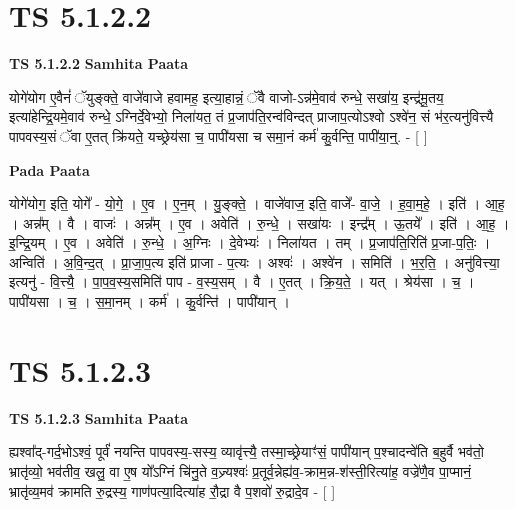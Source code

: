 \documentclass[17pt]{extarticle}
\begin{document}
\section*{ TS 5.1.2.2 }

\textbf{TS 5.1.2.2 } \newline
\textbf{Samhita Paata} \newline

योगे॑योग ए॒वैनं॑ ॅयुङ्क्ते॒ वाजे॑वाजे हवामह॒ इत्या॒हान्नं॒ ॅवै वाजो-ऽन्न॑मे॒वाव॑ रुन्धे॒ सखा॑य॒ इन्द्र॑मू॒तय॒ इत्या॑हेन्द्रि॒यमे॒वाव॑ रुन्धे॒ ऽग्निर्दे॒वेभ्यो॒ निला॑यत॒ तं प्र॒जाप॑ति॒रन्व॑विन्दत् प्राजाप॒त्योऽश्वो ऽश्वे॑न॒ सं भ॑र॒त्यनु॑वित्त्यै पापवस्य॒सं ॅवा ए॒तत् क्रि॑यते॒ यच्छ्रेय॑सा च॒ पापी॑यसा च समा॒नं कर्म॑ कु॒र्वन्ति॒ पापी॑या॒न्॒. - [  ] \newline

\textbf{Pada Paata} \newline

योगे॑योग॒ इति॒ योगे᳚ - यो॒गे॒ । ए॒व । ए॒न॒म् । यु॒ङ्क्ते॒ । वाजे॑वाज॒ इति॒ वाजे᳚- वा॒जे॒ । ह॒वा॒म॒हे॒ । इति॑ । आ॒ह॒ । अन्न᳚म् । वै । वाजः॑ । अन्न᳚म् । ए॒व । अवेति॑ । रु॒न्धे॒ । सखा॑यः । इन्द्र᳚म् । ऊ॒तये᳚ । इति॑ । आ॒ह॒ । इ॒न्द्रि॒यम् । ए॒व । अवेति॑ । रु॒न्धे॒ । अ॒ग्निः । दे॒वेभ्यः॑ । निला॑यत । तम् । प्र॒जाप॑ति॒रिति॑ प्र॒जा-प॒तिः॒ । अन्विति॑ । अ॒वि॒न्द॒त् । प्रा॒जा॒प॒त्य इति॑ प्राजा - प॒त्यः । अश्वः॑ । अश्वे॑न । समिति॑ । भ॒र॒ति॒ । अनु॑वित्त्या॒ इत्यनु॑ - वि॒त्त्यै॒ । पा॒प॒व॒स्य॒समिति॑ पाप - व॒स्य॒सम् । वै । ए॒तत् । क्रि॒य॒ते॒ । यत् । श्रेय॑सा । च॒ । पापी॑यसा । च॒ । स॒मा॒नम् । कर्म॑ । कु॒र्वन्ति॑ । पापी॑यान् ।  \newline




\section*{ TS 5.1.2.3 }

\textbf{TS 5.1.2.3 } \newline
\textbf{Samhita Paata} \newline

ह्यश्वा᳚द्-गर्द॒भोऽश्वं॒ पूर्वं॑ नयन्ति पापवस्य॒-सस्य॒ व्यावृ॑त्त्यै॒ तस्मा॒च्छ्रेयाꣳ॑सं॒ पापी॑यान् प॒श्चादन्वे॑ति ब॒हुर्वै भव॑तो॒ भ्रातृ॑व्यो॒ भव॑तीव॒ खलु॒ वा ए॒ष यो᳚ऽग्निं चि॑नु॒ते व॒ज्र्यश्वः॑ प्र॒तूर्व॒न्नेह्य॑व॒-क्राम॒न्न-श॑स्ती॒रित्या॑ह॒ वज्रे॑णै॒व पा॒प्मानं॒ भ्रातृ॑व्य॒मव॑ क्रामति रु॒द्रस्य॒ गाण॑पत्या॒दित्या॑ह रौ॒द्रा वै प॒शवो॑ रु॒द्रादे॒व - [  ] \newline
\end{document}
